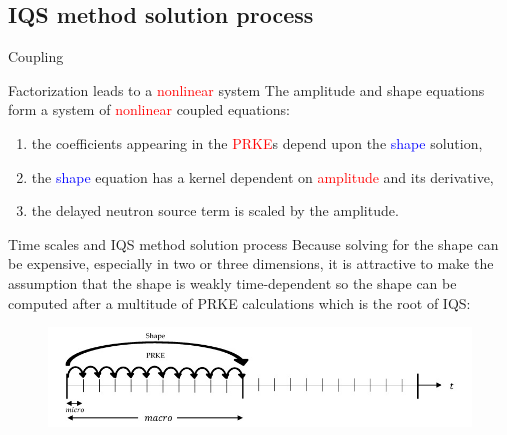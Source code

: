 \documentclass[8pt]{beamer}
\newcommand{\ben}{\begin{enumerate}}
\newcommand{\een}{\end{enumerate}}
\newcommand{\tcr}[1]{\textcolor{red}{#1}}
\newcommand{\tcb}[1]{\textcolor{blue}{#1}}
\begin{document}
\subsection{IQS method solution process}

\begin{frame}{Coupling}

\begin{block}{Factorization leads to a \tcr{nonlinear} system}
The amplitude and shape equations form a system of \tcr{nonlinear} coupled equations: 
\ben
\item the coefficients appearing in the \tcr{PRKE}s depend upon the \tcb{shape} solution,
\item the \tcb{shape} equation has a kernel dependent on \tcr{amplitude} and its derivative,  
\item the delayed neutron source term is scaled by the amplitude.
\een
\end{block}

\begin{block}{Time scales and IQS method solution process}
Because solving for the shape can be expensive, especially in two or three dimensions, it is attractive to make the assumption that the shape is weakly time-dependent so the shape can be computed after a multitude of PRKE calculations which is the root of IQS: 
%

\begin{figure}[h]
\includegraphics[width=\linewidth]{figures/IQS_visualization.jpg}
\label{fig:IQS}
\end{figure}

\end{block}
\end{frame}
\end{document}
